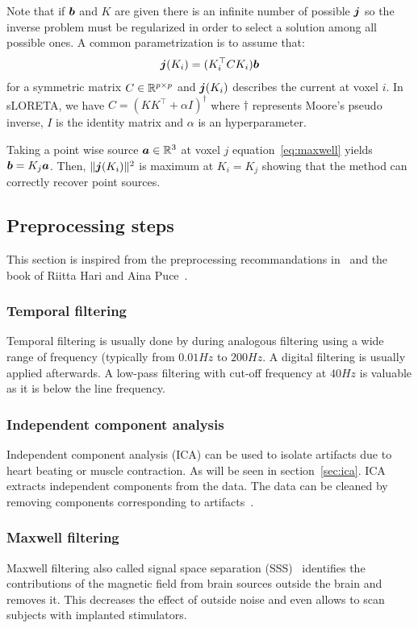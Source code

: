 Note that if $\boldsymbol{b}$ and $K$ are given there is an infinite number of possible
$\boldsymbol{j}$ so the inverse problem must be regularized in order to select a solution among all possible ones.
A common parametrization is to assume that:
\begin{align}
\boldsymbol{j}(K_i) = (K_i^{\top} C K_i) \boldsymbol{b}
\end{align}
for a symmetric matrix $C \in \mathbb{R}^{p \times p}$ and $\boldsymbol{j}(K_i)$ describes the current at voxel $i$.
In sLORETA, we have $C = (K K^{\top} + \alpha I)^{\dagger}$ where $\dagger$
represents Moore's pseudo inverse, $I$ is the identity matrix and $\alpha$ is an hyperparameter. 

Taking a point wise source $\boldsymbol{a} \in \mathbb{R}^{3}$ at voxel $j$
equation~\eqref{eq:maxwell} yields $\boldsymbol{b} = K_j \boldsymbol{a}$.
Then, $\| \boldsymbol{j}(K_i) \|^2$ is maximum at $K_i=K_j$ showing that the method can correctly recover point sources.

\subsection{Preprocessing steps}
This section is inspired from the preprocessing recommandations
in~\cite{jas2018reproducible} and the book of Riitta Hari and Aina
Puce~\cite{hari2017meg}. 

\subsubsection{Temporal filtering}
Temporal filtering is usually done by during analogous filtering using a wide range of
frequency (typically from $0.01 Hz$ to $200Hz$.
A digital filtering is usually applied afterwards. A low-pass filtering with
cut-off frequency at $40 Hz$ is valuable as it is below the line frequency.

\subsubsection{Independent component analysis}
Independent component analysis (ICA) can be used to isolate artifacts due to
heart beating or muscle contraction. As will be seen in section~\ref{sec:ica}.
ICA extracts independent components from the data. The data can be cleaned by
removing components corresponding to artifacts~\cite{jung1998extended}.

\subsubsection{Maxwell filtering}
Maxwell filtering also called signal space separation
(SSS)~\cite{taulu2006spatiotemporal} identifies the contributions of the
magnetic field from brain sources outside the brain and removes it.
This decreases the effect of outside noise and even allows to scan subjects with
implanted stimulators.


